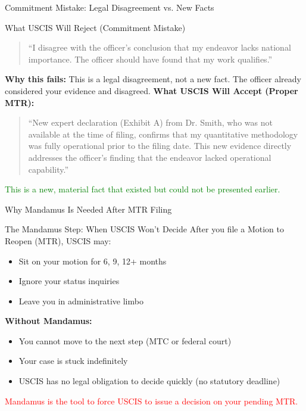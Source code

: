 \documentclass[11pt]{beamer}
\begin{document}
	\begin{frame}{Commitment Mistake: Legal Disagreement vs. New Facts}
		\scriptsize
		\begin{block}{What USCIS Will Reject (Commitment Mistake)}
			\begin{quote}
				``I disagree with the officer's conclusion that my endeavor lacks national importance. The officer should have found that my work qualifies.''
			\end{quote}
			\textbf{Why this fails:} This is a legal disagreement, not a new fact. The officer already considered your evidence and disagreed.
			\vspace{0.3cm}
			\textbf{What USCIS Will Accept (Proper MTR):}
			\begin{quote}
				``New expert declaration (Exhibit A) from Dr. Smith, who was not available at the time of filing, confirms that my quantitative methodology was fully operational prior to the filing date. This new evidence directly addresses the officer's finding that the endeavor lacked operational capability.''
			\end{quote}
			\textcolor{green}{This is a new, material fact that existed but could not be presented earlier.}
		\end{block}
	\end{frame}
	
	\begin{frame}{Why Mandamus Is Needed After MTR Filing}
		\scriptsize
		\begin{block}{The Mandamus Step: When USCIS Won't Decide}
			After you file a Motion to Reopen (MTR), USCIS may:
			\vspace{0.2cm}
			\begin{itemize}
				\item Sit on your motion for 6, 9, 12+ months
				\item Ignore your status inquiries
				\item Leave you in administrative limbo
			\end{itemize}
			\textbf{Without Mandamus:}
			\begin{itemize}
				\item You cannot move to the next step (MTC or federal court)
				\item Your case is stuck indefinitely
				\item USCIS has no legal obligation to decide quickly (no statutory deadline)
			\end{itemize}
			\textcolor{red}{Mandamus is the tool to force USCIS to issue a decision on your pending MTR.}
		\end{block}
	\end{frame}
	
\end{document}
